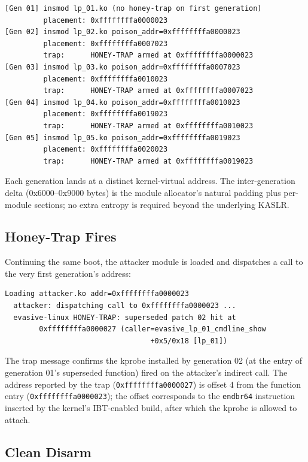 \documentclass[10pt,letterpaper]{article}
\begin{document}
\begin{lstlisting}
[Gen 01] insmod lp_01.ko (no honey-trap on first generation)
         placement: 0xffffffffa0000023
[Gen 02] insmod lp_02.ko poison_addr=0xffffffffa0000023
         placement: 0xffffffffa0007023
         trap:      HONEY-TRAP armed at 0xffffffffa0000023
[Gen 03] insmod lp_03.ko poison_addr=0xffffffffa0007023
         placement: 0xffffffffa0010023
         trap:      HONEY-TRAP armed at 0xffffffffa0007023
[Gen 04] insmod lp_04.ko poison_addr=0xffffffffa0010023
         placement: 0xffffffffa0019023
         trap:      HONEY-TRAP armed at 0xffffffffa0010023
[Gen 05] insmod lp_05.ko poison_addr=0xffffffffa0019023
         placement: 0xffffffffa0020023
         trap:      HONEY-TRAP armed at 0xffffffffa0019023
\end{lstlisting}

Each generation lands at a distinct kernel-virtual address. The
inter-generation delta (0x6000--0x9000 bytes) is the module allocator's
natural padding plus per-module sections; no extra entropy is
required beyond the underlying KASLR.

\subsection{Honey-Trap Fires}

Continuing the same boot, the attacker module is loaded and dispatches
a call to the very first generation's address:

\begin{lstlisting}
Loading attacker.ko addr=0xffffffffa0000023
  attacker: dispatching call to 0xffffffffa0000023 ...
  evasive-linux HONEY-TRAP: superseded patch 02 hit at
        0xffffffffa0000027 (caller=evasive_lp_01_cmdline_show
                                  +0x5/0x18 [lp_01])
\end{lstlisting}

The trap message confirms the kprobe installed by generation 02 (at
the entry of generation 01's superseded function) fired on the
attacker's indirect call. The address reported by the trap
(\texttt{0xffffffffa0000027}) is offset 4 from the function entry
(\texttt{0xffffffffa0000023}); the offset corresponds to the
\texttt{endbr64} instruction inserted by the kernel's IBT-enabled
build, after which the kprobe is allowed to attach.

\subsection{Clean Disarm}
\end{document}
